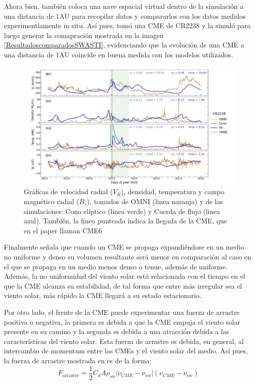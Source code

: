Ahora bien, \cite{mayank-2023} también coloca una nave espacial virtual dentro de la simulación a una distancia de 1AU para recopilar datos y compararlos con los datos medidos experimentlamente in situ. Así pues, tomó una \ac{CME} de CR2238 y la simuló para luego generar la comapración mostrada en la imagen \ref{ResultadoscomparadosSWASTI}, evidenciando que la evolución de una \ac{CME} a una distancia de 1AU coincide en buena medida con los modelos utilizados.
\begin{figure}[H]
\centering
    \includegraphics[width=1\linewidth]{imag/ResultadoscomparadosSWASTI.png}
    \caption[Gráficas de velocidad radial, densidad, temperatura y campo magnético radial tomados por OMNI comparados con la simualción de \cite{mayank-2023}]{Gráficas de velocidad radial ($V_R$), densidad, temperatura y campo magnético radial ($B_r$), tomados de OMNI (linea naranja) y de las simulaciones: Cono elíptico (linea verde) y Cuerda de flujo (linea azul). También, la línea punteada indica la llegada de la CME, que en el paper llaman CME6}
    \label{fig:ResultadoscomparadosSWASTI}
\end{figure}

Finalmente \cite{mayank-2023} señala que cuando un \ac{CME} se propaga  expandiéndose en un medio no uniforme y denso su volumen resultante será menor en comparación al caso en el que se propaga en un medio menos denso o tenue, además de uniforme. Además, la no uniformidad del viento solar está relacionada con el tiempo en el que la \ac{CME} alcanza su estabilidad, de tal forma que entre más irregular sea el viento solar, más rápido la \ac{CME} llegará a su estado estacionario.

Por otro lado, el frente de la \ac{CME} puede experimentar una fuerza de arrastre positiva o negativa, la primera es debida a que la \ac{CME} empuja el viento solar presente en su camino y la segunda es debida a una atracción debida a las características del viento solar. Esta fuerza de arrastre es debida, en general, al intercambio de momentum entre las \acp{CME} y el viento solar del medio.
Así pues, la fuerza de arrastre mostrada en \cite{mayank-2023} es de la forma:
\begin{equation}
F_{\text{arrastre}}=\frac{1}{2}C_{d}A\rho_{sw}|\nu_{CME}-\nu_{sw}|(\nu_{CME}-\nu_{sw})
\end{equation}


